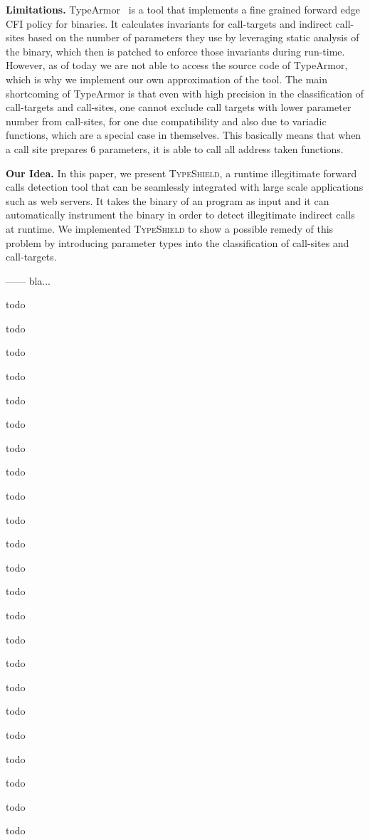 \textbf{Limitations.} TypeArmor~\cite{veen:typearmor} is a tool that implements a fine grained forward edge CFI 
policy for binaries. It calculates invariants for call-targets and indirect call-sites based on
the number of parameters they use by leveraging static analysis of the binary, which then is
patched to enforce those invariants during run-time. However, as of today we are not able to 
access the source code of TypeArmor, which is why we implement our own approximation of the 
tool. The main shortcoming of TypeArmor is that even with high precision in the classification of 
call-targets and call-sites, one cannot exclude call targets with lower parameter number from 
call-sites, for one due compatibility and also due to variadic functions, which are a special
case in themselves. This basically means that when a call site prepares 6 parameters, it is 
able to call all address taken functions.

\textbf{Our Idea.} In this paper, we present \textsc{TypeShield}, a runtime illegitimate forward 
calls detection tool that can be seamlessly integrated with large scale applications such as web servers.
It takes the binary of an program as input and it can automatically instrument the binary in order
to detect illegitimate indirect calls at runtime. 
We implemented \textsc{TypeShield} to show a possible remedy of this problem by introducing
parameter types into the classification of call-sites and call-targets. 

------
bla...

todo

todo


todo

todo

todo


todo


todo

todo

todo

todo

todo


todo

todo

todo

todo

todo

todo

todo

todo

todo


todo

todo

todo


